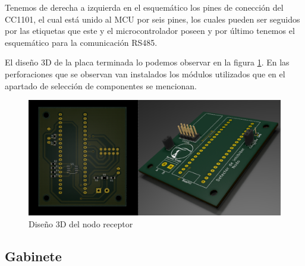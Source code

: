 Tenemos de derecha a izquierda en el esquemático los pines de conección del CC1101, el cual está unido al MCU por seis pines, los 
cuales pueden ser seguidos por las etiquetas que este y el microcontrolador poseen y por último tenemos el esquemático para 
la comunicación RS485. \par 

El diseño 3D de la placa terminada lo podemos observar en la figura \ref{3d_nodo}. En las perforaciones que se observan van 
instalados los módulos utilizados que en el apartado de selección de componentes se mencionan.

\begin{figure}
	\centering
	\includegraphics[scale=0.4]{images/nodos/3d_nodo.png}
    \caption{Diseño 3D del nodo receptor}
	\label{3d_nodo}
\end{figure}

\subsection{Gabinete}


